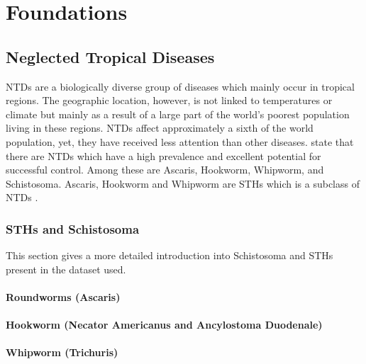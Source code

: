 \chapter{Foundations}
\label{ch:Foundations}

\section{Neglected Tropical Diseases}
\label{sec:Foundations:NTDs}

\ac{NTDs} \cite{feasey2010neglected} are a biologically diverse group of diseases which mainly occur in tropical regions. The geographic location, however, is not linked to temperatures or climate but mainly as a result of a large part of the world's poorest population living in these regions. \ac{NTDs} affect approximately a sixth of the world population, yet, they have received less attention than other diseases. \textcite{feasey2010neglected} state that there are \ac{NTDs} which have a high prevalence and excellent potential for successful control. Among these are Ascaris, Hookworm, Whipworm, and Schistosoma. Ascaris, Hookworm and Whipworm are \ac{STHs} which is a subclass of \ac{NTDs} .

\subsection{\acl{STHs} and Schistosoma}
\label{sec:Foundations:NTDs:STHs}

This section gives a more detailed introduction into Schistosoma and \acl{STHs} present in the dataset used.


\label{sec:Foundations:NTDs:STHs}

\subsubsection{Roundworms (Ascaris)}
\label{sec:Foundations:NTDs:STHs:Ascaris}

\subsubsection{Hookworm (Necator Americanus and Ancylostoma Duodenale)}
\label{sec:Foundations:NTDs:STHs:Hookworm}

\subsubsection{Whipworm (Trichuris)}
\label{sec:Foundations:NTDs:STHs:Whipworm}

